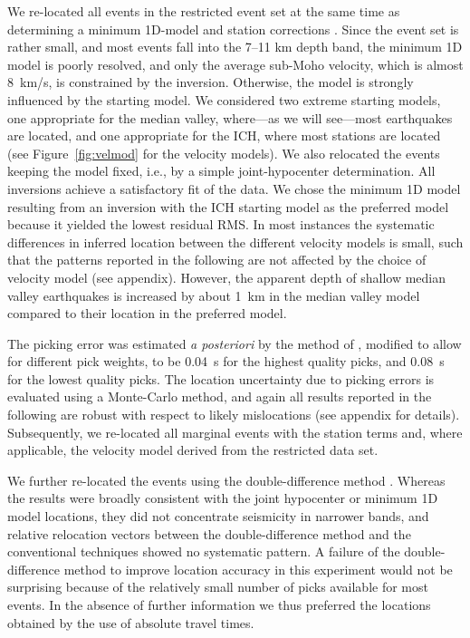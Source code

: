 \documentclass[jgr]{agu2001}
\newlength{\tw}
\begin{document}
\begin{article}
We re-located all events in the restricted event set at the same time as determining a minimum
1D-model and station corrections \citep[using VELEST,][]{kissling94}.  Since the event set is rather small, and most events
fall into the 7--11 km depth band, the 
minimum 1D model is poorly resolved, and only the average sub-Moho
velocity, which is almost 8~km/s,
is constrained by the inversion.
 Otherwise, the model is strongly influenced by the starting 
model.  We considered two extreme starting models, one appropriate for
the median valley, where---as we will see---most earthquakes are located, and
one appropriate for the ICH, where most stations are located (see
Figure~\ref{fig:velmod} for the velocity models). We also
relocated the events keeping the model fixed, i.e., by a simple
joint-hypocenter determination.  All inversions achieve a satisfactory fit of
the data. We chose the minimum 1D model resulting from an inversion with the
ICH starting model as the preferred model because it yielded the
lowest residual RMS.  In most instances the systematic differences in
inferred location between the different velocity models is small, such
that the patterns reported in the following are not affected by the
choice of velocity model (see appendix).
However, the apparent depth of shallow median valley earthquakes is
increased by about 1~km in the median valley model compared to their
location in the preferred model.  

The picking error was estimated {\it a posteriori} by the method of
\citet{wilcock91}, modified to allow for different pick weights, to be 0.04~s
for the highest quality picks, and 0.08~s for the lowest quality picks.
The location uncertainty due to
picking errors is evaluated using a Monte-Carlo method, and again all
results reported in the following are robust with respect to likely
mislocations (see appendix for details).  
Subsequently, we re-located all marginal events with the station
terms and, where applicable, the velocity model derived from the
restricted data set. 

We further re-located the events using the
double-difference method \citep{waldhauser00}.  Whereas the results
were broadly consistent with the joint hypocenter or minimum 1D model
locations, they did not concentrate seismicity in narrower bands, and
relative relocation vectors between the double-difference method and
the conventional techniques showed no systematic pattern.  A failure
of the double-difference method to improve location accuracy in this
experiment would not be surprising
because of the relatively small number of picks available for most
events. In the absence of further information we thus preferred the
locations obtained by the use of absolute travel times.


\end{article}
\end{document}
